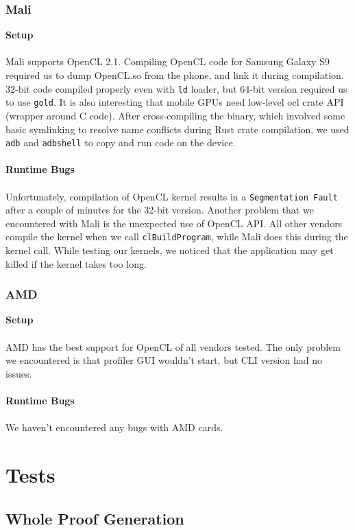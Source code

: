 \subsubsection{Mali}
\textbf{Setup}\\\\
Mali supports OpenCL 2.1. Compiling OpenCL code for Samsung Galaxy S9 required us to dump OpenCL.so from the phone, and link it during compilation. 32-bit code compiled properly even with \texttt{ld} loader, but 64-bit version required us to use \texttt{gold}. It is also interesting that mobile GPUs need low-level ocl crate API (wrapper around C code). After cross-compiling the binary, which involved some basic symlinking to resolve name conflicts during Rust crate compilation, we used \texttt{adb} and \texttt{adbshell} to copy and run code on the device.\\\\
\textbf{Runtime Bugs}\\\\
Unfortunately, compilation of OpenCL kernel results in a \texttt{Segmentation Fault} after a couple of minutes for the 32-bit version. Another problem that we encountered with Mali is the unexpected use of OpenCL API. All other vendors compile the kernel when we call \texttt{clBuildProgram}, while Mali does this during the kernel call. While testing our kernels, we noticed that the application may get killed if the kernel takes too long.

\subsubsection{AMD}
\textbf{Setup}\\\\
AMD has the best support for OpenCL of all vendors tested. The only problem we encountered is that profiler GUI wouldn't start, but CLI version had no issues.\\\\
\textbf{Runtime Bugs}\\\\
We haven't encountered any bugs with AMD cards.

\section{Tests}

\subsection{Whole Proof Generation}

